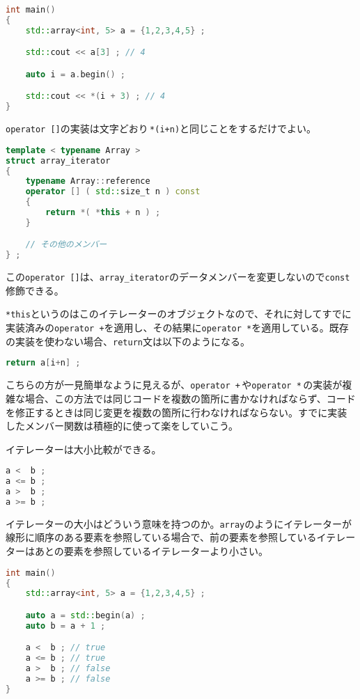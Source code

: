 \ifTombow\pagebreak\fi
\begin{lstlisting}[language={C++}]
int main()
{
    std::array<int, 5> a = {1,2,3,4,5} ;

    std::cout << a[3] ; // 4

    auto i = a.begin() ;

    std::cout << *(i + 3) ; // 4
}
\end{lstlisting}

\texttt{operator []}の実装は文字どおり\,\texttt{*(i+n)}と同じことをするだけでよい。

\begin{lstlisting}[language={C++}]
template < typename Array >
struct array_iterator
{
    typename Array::reference
    operator [] ( std::size_t n ) const
    {
        return *( *this + n ) ;
    }

    // その他のメンバー
} ;
\end{lstlisting}

この\texttt{operator []}は、\texttt{array\_iterator}のデータメンバーを変更しないので\texttt{const}修飾できる。

\texttt{*this}というのはこのイテレーターのオブジェクトなので、それに対してすでに実装済みの\texttt{operator +}を適用し、その結果に\texttt{operator *}を適用している。既存の実装を使わない場合、\texttt{return}文は以下のようになる。

\begin{lstlisting}[language={C++}]
return a[i+n] ;
\end{lstlisting}

こちらの方が一見簡単なように見えるが、\texttt{operator +}\,や\texttt{operator *}\,の実装が複雑な場合、この方法では同じコードを複数の箇所に書かなければならず、コードを修正するときは同じ変更を複数の箇所に行わなければならない。すでに実装したメンバー関数は積極的に使って楽をしていこう。

イテレーターは大小比較ができる。

\begin{lstlisting}[language={C++}]
a <  b ;
a <= b ;
a >  b ;
a >= b ;
\end{lstlisting}

イテレーターの大小はどういう意味を持つのか。\texttt{array}のようにイテレーターが線形に順序のある要素を参照している場合で、前の要素を参照しているイテレーターはあとの要素を参照しているイテレーターより小さい。

\begin{lstlisting}[language={C++}]
int main()
{
    std::array<int, 5> a = {1,2,3,4,5} ;

    auto a = std::begin(a) ;
    auto b = a + 1 ;

    a <  b ; // true
    a <= b ; // true
    a >  b ; // false
    a >= b ; // false
}
\end{lstlisting}

